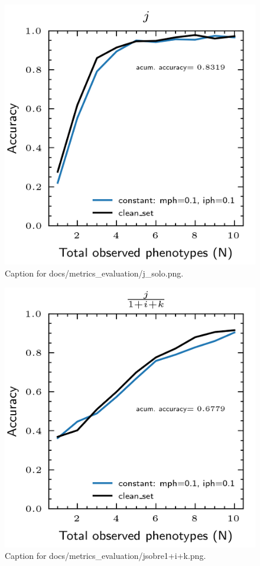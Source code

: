 \documentclass{article}
\begin{document}
\begin{figure}[h] \centering \includegraphics{docs/metrics_evaluation/j_solo.png} \caption{Caption for docs/metrics_evaluation/j_solo.png.} \end{figure}
\begin{figure}[h] \centering \includegraphics{docs/metrics_evaluation/jsobre1+i+k.png} \caption{Caption for docs/metrics_evaluation/jsobre1+i+k.png.} \end{figure}
\end{document}
